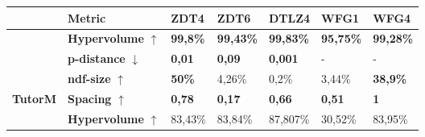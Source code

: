 \begin{table}[]
    \centering
    \begin{tabular}{@{}lllllll@{}}
    \toprule
                                                                                              & Metric      & ZDT4                                     & ZDT6                                     & DTLZ4                                     & WFG1                                     & WFG4                                     \\ \midrule
                                                                                              & \textbf{Hypervolume} $\uparrow$  & \cellcolor[HTML]{EFEFEF}\textbf{99,8\%} & \cellcolor[HTML]{EFEFEF}\textbf{99,43\%} & \cellcolor[HTML]{EFEFEF}\textbf{99,83\%} & \cellcolor[HTML]{EFEFEF}\textbf{95,75\%} & \cellcolor[HTML]{EFEFEF}\textbf{99,28\%} \\
                                                                                              & \textbf{p-distance} $\downarrow$  & \cellcolor[HTML]{EFEFEF}\textbf{0,01}    & \cellcolor[HTML]{EFEFEF}\textbf{0,09}    & \cellcolor[HTML]{EFEFEF}\textbf{0,001}    & -                                        & -                                        \\
                                                                                              & \textbf{ndf-size} $\uparrow$     & \cellcolor[HTML]{EFEFEF}\textbf{50\%}                          & 4,26\%                                   & 0,2\%                                     & 3,44\%                                   & \cellcolor[HTML]{EFEFEF}\textbf{38,9\%} \\
    \multirow{-4}{*}{\textbf{TutorM}}                                                         & \textbf{Spacing} $\uparrow$      & \cellcolor[HTML]{EFEFEF}\textbf{0,78}    & \cellcolor[HTML]{EFEFEF}\textbf{0,17}    & \cellcolor[HTML]{EFEFEF}\textbf{0,66}    & \cellcolor[HTML]{EFEFEF}\textbf{0,51}    & \cellcolor[HTML]{EFEFEF}\textbf{1}       \\ \midrule
                                                                                              & \textbf{Hypervolume} $\uparrow$  & 83,43\%                                  & 83,84\%                                  & 87,807\%                                  & 30,52\%                                  & 83,95\%                                  \\ 

\end{tabular}
\end{table}
